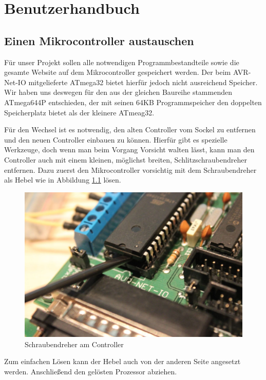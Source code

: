 \chapter{Benutzerhandbuch} 
\label{chap:Benutzerhandbuch}

\section{Einen Mikrocontroller austauschen}
Für unser Projekt sollen alle notwendigen Programmbestandteile sowie die gesamte
Website auf dem Mikrocontroller gespeichert werden. Der beim AVR-Net-IO
mitgelieferte ATmega32 bietet hierfür jedoch nicht ausreichend Speicher.
Wir haben uns deswegen für den aus der gleichen Baureihe stammenden ATmega644P
entschieden, der mit seinen 64KB Programmspeicher den doppelten Speicherplatz
bietet als der kleinere ATmeag32.

Für den Wechsel ist es notwendig, den alten Controller vom Sockel zu entfernen
und den neuen Controller einbauen zu können. Hierfür gibt es spezielle
Werkzeuge, doch wenn man beim Vorgang Vorsicht walten lässt, kann man den
Controller auch mit einem kleinen, möglichst breiten, Schlitzschraubendreher
entfernen. Dazu zuerst den Mikrocontroller vorsichtig mit dem Schraubendreher
als Hebel wie in Abbildung \ref{ausbau1} lösen.

\begin{figure}[H]
\centering
\includegraphics[width=13cm]{content/pictures/Anleitung/tauscheProzessor/1_Hebel.jpg}
\caption{Schraubendreher am Controller}
\label{ausbau1}
\end{figure}

Zum einfachen Lösen kann der Hebel auch von der anderen Seite angesetzt
werden. Anschließend den gelösten Prozessor abziehen.

